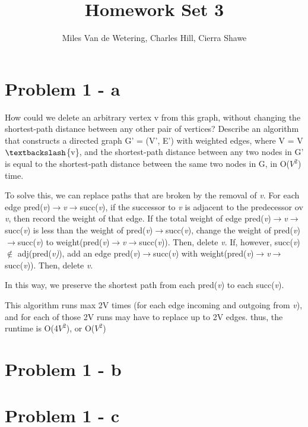 \documentclass[]{report}
\title{Homework Set 3}
\author{Miles Van de Wetering, Charles Hill, Cierra Shawe}
\begin{document}
\maketitle

\section*{Problem 1 - a}
How could we delete an arbitrary vertex v from this graph, without changing the shortest-path distance
between any other pair of vertices? Describe an algorithm that constructs a directed graph G' = (V', E') with weighted edges, where V = V $\textbackslash$\{v\}, and the shortest-path distance between any two nodes in G' is equal to the shortest-path distance between the same two nodes in G, in O($V^2$) time.

To solve this, we can replace paths that are broken by the removal of \textit{v}. For each edge pred(\textit{v})$\rightarrow$\textit{v}$\rightarrow$succ(\textit{v}), if the successor to \textit{v} is adjacent to the predecessor ov \textit{v}, then record the weight of that edge. If the total weight of edge pred(\textit{v})$\rightarrow$\textit{v}$\rightarrow$succ(\textit{v}) is less than the weight of pred(\textit{v})$\rightarrow$succ(\textit{v}), change the weight of  pred(\textit{v})$\rightarrow$succ(\textit{v}) to weight(pred(\textit{v})$\rightarrow$\textit{v}$\rightarrow$succ(\textit{v})). Then, delete \textit{v}. If, however, succ(\textit{v}) $\notin$ adj(pred(\textit{v)}), add an edge pred(\textit{v})$\rightarrow$succ(\textit{v}) with weight(pred(\textit{v})$\rightarrow$\textit{v}$\rightarrow$succ(\textit{v})). Then, delete \textit{v}. 

In this way, we preserve the shortest path from each pred(\textit{v}) to each succ(\textit{v}). 

This algorithm runs max 2V times (for each edge incoming and outgoing from \textit{v}), and for each of those 2V runs may have to replace up to 2V edges. thus, the runtime is O(4$V^2$), or O($V^2$)  
\section*{Problem 1 - b}

\section*{Problem 1 - c}
\end{document}
